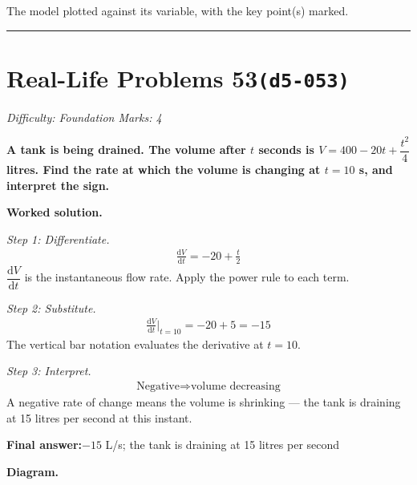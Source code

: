 \documentclass[11pt]{article}
\newcommand{\question}[1]{\par\medskip\noindent\textbf{#1}\par}
\begin{document}
\small The model plotted against its variable, with the key point(s) marked.\normalsize

\medskip\hrule

\section*{Real-Life Problems 53\quad\small\texttt{(d5-053)}}
\textit{Difficulty: Foundation \quad\textbar\quad Marks: 4}

\question{A tank is being drained. The volume after \( t \) seconds is \( V = 400 - 20t + \dfrac{t^2}{4} \) litres. Find the rate at which the volume is changing at \( t = 10 \) s, and interpret the sign.}

\textbf{Worked solution.}

\textit{Step 1: Differentiate.}
\[\begin{gathered}
\frac{\mathrm{d}V}{\mathrm{d}t} = -20 + \frac{t}{2}
\end{gathered}\]
\( \dfrac{\mathrm{d}V}{\mathrm{d}t} \) is the instantaneous flow rate. Apply the power rule to each term.

\textit{Step 2: Substitute.}
\[\begin{gathered}
\frac{\mathrm{d}V}{\mathrm{d}t}\bigg|_{t=10} = -20 + 5 = -15
\end{gathered}\]
The vertical bar notation evaluates the derivative at \( t = 10 \).

\textit{Step 3: Interpret.}
\[\begin{gathered}
\text{Negative} \Rightarrow \text{volume decreasing}
\end{gathered}\]
A negative rate of change means the volume is shrinking --- the tank is draining at 15 litres per second at this instant.

\begin{answerbox}
\textbf{Final answer:}\quad \(\displaystyle  -15 \) L/s; the tank is draining at 15 litres per second
\end{answerbox}
\textbf{Diagram.}
\end{document}
